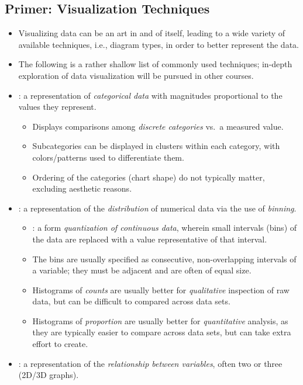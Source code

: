 \begin{itemize}
  \subsection{Primer: Visualization Techniques}
  \begin{itemize}
    \item Visualizing data can be an art in and of itself, leading to a wide variety of available techniques, i.e., diagram types, in order to better represent the data.
    \item The following is a rather shallow list of commonly used techniques; in-depth exploration of data visualization will be pursued in other courses.
    \item {}: a representation of \emph{categorical data} with magnitudes proportional to the values they represent. 
      \begin{itemize}
        \item Displays comparisons among \emph{discrete categories} vs.\ a measured value.
        \item Subcategories can be displayed in clusters within each category, with colors/patterns used to differentiate them.
        \item Ordering of the categories (chart shape) do not typically matter, excluding aesthetic reasons.
      \end{itemize}
    \item {}: a representation of the \emph{distribution} of numerical data via the use of \emph{binning}.
      \begin{itemize}
        \item {}: a form \emph{quantization of continuous data}, wherein small intervals (bins) of the data are replaced with a value representative of that interval.
        \item The bins are usually specified as consecutive, non-overlapping intervals of a variable; they must be adjacent and are often of equal size.
        \item Histograms of \emph{counts} are usually better for \emph{qualitative} inspection of raw data, but can be difficult to compared across data sets.
        \item Histograms of \emph{proportion} are usually better for \emph{quantitative} analysis, as they are typically easier to compare across data sets, but can take extra effort to create.
      \end{itemize}
    \item {}: a representation of the \emph{relationship between variables}, often two or three (2D/3D graphs).

\end{itemize}
\end{itemize}
